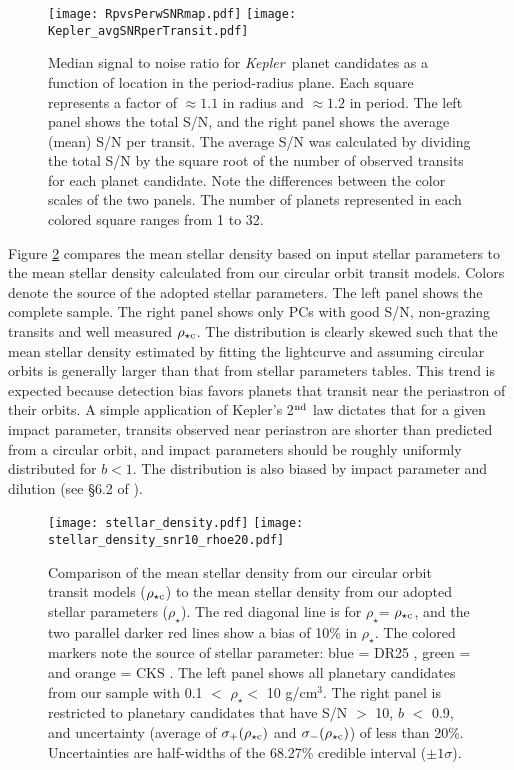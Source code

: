 \documentclass{aastex62}
\newcommand{\ik}{{\it Kepler~}}
\newcommand{\rhostar}{\ensuremath{\rho_\star}}
\newcommand{\rhoc}{\ensuremath{\rho_{\star {\rm c}}}}
\begin{document}
\begin{figure}[!hbt]
\texttt{[image: RpvsPerwSNRmap.pdf]}
\texttt{[image: Kepler\_avgSNRperTransit.pdf]}
\caption{Median signal to noise ratio for \ik planet candidates as a function of location in the period-radius plane. Each square represents a factor of $\approx 1.1$ in radius and $\approx 1.2$ in period. The left panel shows the total S/N, and the right panel shows the average (mean) S/N per transit.  The average S/N was calculated by dividing the total S/N by the square root of the number of observed transits for each planet candidate. Note the differences between the color scales of the two panels. The number of planets represented in each colored square ranges from 1 to 32. 
}\label{fig:perrad_snrmap}
\end{figure}

Figure \ref{fig:mean_stellar_density} compares the mean stellar density based on input stellar parameters to the mean stellar density calculated from our circular orbit transit models. Colors denote the source of the adopted stellar parameters. The left panel shows the complete sample.  The right panel shows only PCs with good S/N, non-grazing transits and well measured \rhoc.   The distribution is clearly skewed such that the mean stellar density estimated by fitting the lightcurve and assuming  circular orbits is generally larger than that from stellar parameters tables.  This trend is expected because detection bias favors planets that transit near the periastron of their orbits.  A simple application of Kepler's 2$^{\rm nd}$ law dictates that for a given impact parameter, transits observed near periastron are shorter than predicted from a circular orbit, and impact parameters should be roughly uniformly distributed for $b<1$. The distribution is also biased by impact parameter and dilution (see \S6.2 of \citealt{Rowe:2015b}).

\begin{figure}[!hbt]
\texttt{[image: stellar\_density.pdf]}
\texttt{[image: stellar\_density\_snr10\_rhoe20.pdf]}
\caption{Comparison of the mean stellar density from our circular orbit transit models (\rhoc) to the mean stellar density from our adopted stellar parameters (\rhostar). The red diagonal line is for \rhostar = \rhoc, and the two parallel darker red lines show a bias of 10\% in \rhostar.  The colored markers note the source of stellar parameter: blue = DR25 \citep{Thompson:2018}, green = \cite{Berger:2020a} and orange = CKS \citep{Fulton:2018}.  The left panel shows all planetary candidates from our sample with 0.1 $<$ \rhostar $<$ 10 g/cm$^3$.  The right panel is restricted to planetary candidates that have S/N $>$ 10, $b$ $<$ 0.9, and  uncertainty (average of $\sigma_+(\rhoc)$ and $\sigma_-(\rhoc)$) of less than 20\%.  Uncertainties are half-widths of the 68.27\% credible interval ($\pm 1 \sigma$). 
}\label{fig:mean_stellar_density}
\end{figure}
\end{document}
